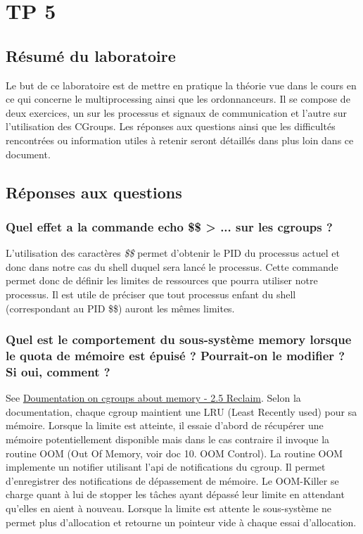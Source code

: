 \documentclass{ReportTemplate}
\begin{document}
\chapter{TP 5}
\section{Résumé du laboratoire}
Le but de ce laboratoire est de mettre en pratique la théorie vue dans le cours
en ce qui concerne le multiprocessing ainsi que les ordonnanceurs. Il se compose
de deux exercices, un sur les processus et signaux de communication et l'autre
sur l'utilisation des CGroups. Les réponses aux questions ainsi que les
difficultés rencontrées ou information utiles à retenir seront détaillés dans
plus loin dans ce document.

\section{Réponses aux questions}
\subsection{Quel effet a la commande echo \$\$ > ... sur les cgroups ?}
L'utilisation des caractères \textit{\$\$} permet d'obtenir le PID du processus
actuel et donc dans notre cas du shell duquel sera lancé le processus. Cette
commande permet donc de définir les limites de ressources que pourra utiliser
notre processus. Il est utile de préciser que tout processus enfant du shell
(correspondant au PID \$\$) auront les mêmes limites.
\subsection{Quel est le comportement du sous-système memory lorsque le quota de mémoire est épuisé ? Pourrait-on le modifier ? Si oui, comment ?}
See
\href{https://www.kernel.org/doc/Documentation/cgroup-v1/memory.txt}{Doumentation
on cgroups about memory - 2.5 Reclaim}.\newline
Selon la documentation, chaque cgroup maintient une LRU (Least Recently used)
pour sa mémoire. Lorsque la limite est atteinte, il essaie d'abord de récupérer
une mémoire potentiellement disponible mais dans le cas contraire il invoque la
routine OOM (Out Of Memory, voir doc 10. OOM Control). La routine OOM implemente
un notifier utilisant l'api de notifications du cgroup. Il permet d'enregistrer
des notifications de dépassement de mémoire. Le OOM-Killer se charge quant à lui
de stopper les tâches ayant dépassé leur limite en attendant qu'elles en aient à
nouveau.\newline
Lorsque la limite est attente le sous-système ne permet plus d'allocation et
retourne un pointeur vide à chaque essai d'allocation.
\end{document}
